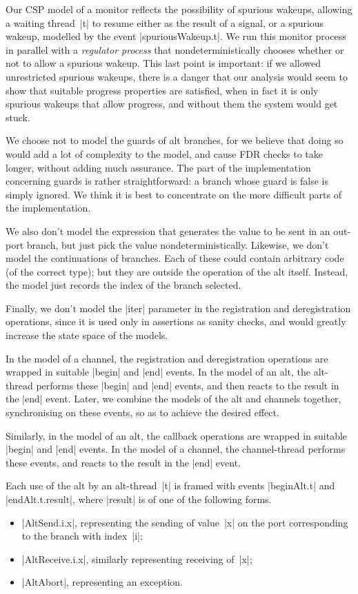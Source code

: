 Our CSP model of a monitor reflects the possibility of spurious wakeups,
allowing a waiting thread~|t| to resume either as the result of a signal, or a
spurious wakeup, modelled by the event |spuriousWakeup.t|.  We run this
monitor process in parallel with a \emph{regulator process}  that nondeterministically chooses whether or not
to allow a spurious wakeup.  This last point is important: if we allowed
unrestricted spurious wakeups, there is a danger that our analysis would seem
to show that suitable progress properties are satisfied, when in fact it is
only spurious wakeups that allow progress, and without them the system would
get stuck.

We choose not to model the guards of alt branches, for we believe that doing
so would add a lot of complexity to the model, and cause FDR checks to take
longer, without adding much assurance.  The part of the implementation
concerning guards is rather straightforward: a branch whose guard is false is
simply ignored.  We think it is best to concentrate on the more difficult
parts of the implementation.

We also don't model the expression that generates the value to be sent in an
out-port branch, but just pick the value nondeterministically.  Likewise, we
don't model the continuations of branches.  Each of these could contain
arbitrary code (of the correct type); but they are outside the operation of
the alt itself.  Instead, the model just records the index of the branch
selected. 
 
Finally, we don't model the |iter| parameter in the registration and
deregistration operations, since it is used only in assertions as sanity
checks, and would greatly increase the state space of the models.

In the model of a channel, the registration and deregistration operations are
wrapped in suitable |begin| and |end| events.  In the model of an alt, the
alt-thread performs these |begin| and |end| events, and then reacts to the
result in the |end| event.  Later, we combine the models of the alt and
channels together, synchronising on these events, so as to achieve the desired
effect.

Similarly, in the model of an alt, the callback operations are wrapped in
suitable |begin| and |end| events.  In the model of a channel, the
channel-thread performs these events, and reacts to the result in the |end|
event.  

Each use of the alt by an alt-thread~|t| is framed with events |beginAlt.t|
and |endAlt.t.result|, where |result| is of one of the following forms.
%
\begin{itemize}
\item |AltSend.i.x|, representing the sending of value~|x| on the port
  corresponding to the branch with index~|i|;

\item |AltReceive.i.x|, similarly representing receiving of~|x|;

\item |AltAbort|, representing an  exception.
\end{itemize}
